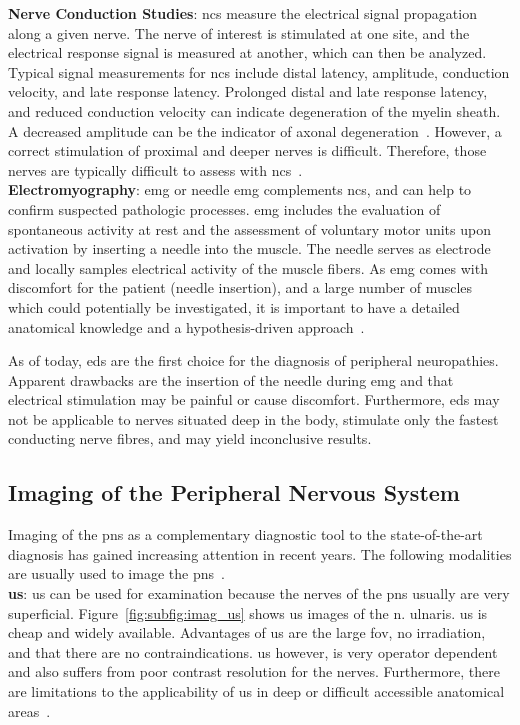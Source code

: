 \textbf{Nerve Conduction Studies}: \gls{ncs} measure the electrical signal propagation along a given nerve. The nerve of interest is stimulated at one site, and the electrical response signal is measured at another, which can then be analyzed. Typical signal measurements for \gls{ncs} include distal latency, amplitude, conduction velocity, and late response latency. Prolonged distal and late response latency, and reduced conduction velocity can indicate degeneration of the myelin sheath. A decreased amplitude can be the indicator of axonal degeneration~\cite{Mohassel2015}. However, a correct stimulation of proximal and deeper nerves is difficult. Therefore, those nerves are typically difficult to assess with \gls{ncs}~\cite{Mohassel2015}. \\

\textbf{Electromyography}: \gls{emg} or needle \gls{emg} complements \gls{ncs}, and can help to confirm suspected pathologic processes. \gls{emg} includes the evaluation of spontaneous activity at rest and the assessment of voluntary motor units upon activation by inserting a needle into the muscle. The needle serves as electrode and locally samples electrical activity of the muscle fibers. As \gls{emg} comes with discomfort for the patient (needle insertion), and a large number of muscles which could potentially be investigated, it is important to have a detailed anatomical knowledge and a hypothesis-driven approach~\cite{Mohassel2015}.

As of today, \gls{eds} are the first choice for the diagnosis of peripheral neuropathies. Apparent drawbacks are the insertion of the needle during \gls{emg} and that electrical stimulation may be painful or cause discomfort. Furthermore, \gls{eds} may not be applicable to nerves situated deep in the body, stimulate only the fastest conducting nerve fibres, and may yield inconclusive results.

\subsection{Imaging of the Peripheral Nervous System}
Imaging of the \gls{pns} as a complementary diagnostic tool to the state-of-the-art diagnosis has gained increasing attention in recent years. The following modalities are usually used to image the \gls{pns}~\cite{Ohana2014CurrentSystem}.\\

\textbf{\gls{us}}: \gls{us} can be used for examination because the nerves of the \gls{pns} usually are very superficial. Figure~\ref{fig:subfig:imag_us} shows \gls{us} images of the \gls{n.} ulnaris. \gls{us} is cheap and widely available. Advantages of \gls{us} are the large \gls{fov}, no irradiation, and that there are no contraindications. \gls{us} however, is very operator dependent and also suffers from poor contrast resolution for the nerves. Furthermore, there are limitations to the applicability of \gls{us} in deep or difficult accessible anatomical areas~\cite{Ohana2014CurrentSystem}.\\

